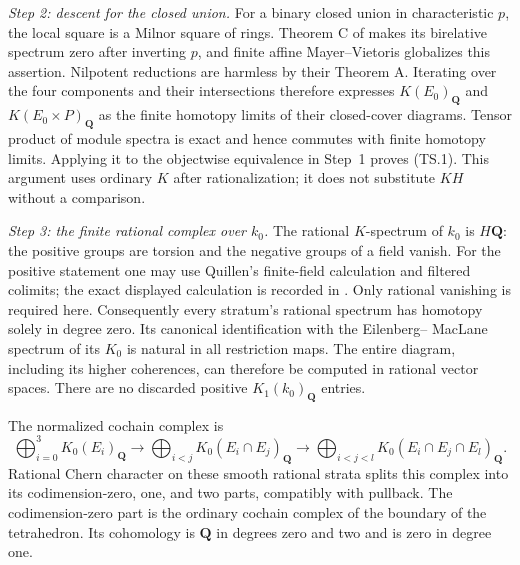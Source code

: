 \emph{Step 2: descent for the closed union.}
For a binary closed union in characteristic $p$, the local square is a
Milnor square of rings.  Theorem C of
\citet[p.~30]{rootGeisserHesselholt2011} makes its birelative spectrum
zero after inverting $p$, and finite affine Mayer--Vietoris globalizes
this assertion.  Nilpotent reductions are harmless by their Theorem A.
Iterating over the four components and their intersections therefore
expresses $K(E_0)_{\mathbf Q}$ and $K(E_0\times P)_{\mathbf Q}$ as
the finite homotopy limits of their closed-cover diagrams.  Tensor
product of module spectra is exact and hence commutes with finite
homotopy limits.  Applying it to the objectwise equivalence in Step~1
proves (TS.1).  This argument uses ordinary $K$ after rationalization;
it does not substitute $KH$ without a comparison.

\emph{Step 3: the finite rational complex over $k_0$.}
The rational $K$-spectrum of $k_0$ is $H\mathbf Q$: the positive
groups are torsion and the negative groups of a field vanish.
For the positive statement one may use Quillen's finite-field
calculation and filtered colimits; the exact displayed calculation
is recorded in \citet[Chapter~IV, Corollary~1.13 and Example~2.6]
{D_Weibel2013KbookIV}.  Only rational vanishing is required here.
Consequently every stratum's rational spectrum has homotopy solely
in degree zero.  Its canonical identification with the Eilenberg--
MacLane spectrum of its $K_0$ is natural in all restriction maps.
The entire diagram, including its higher coherences, can therefore be
computed in rational vector spaces.  There are no discarded positive
$K_1(k_0)_{\mathbf Q}$ entries.

The normalized cochain complex is
\begin{equation}
 \bigoplus_{i=0}^3 K_0(E_i)_{\mathbf Q}
   \longrightarrow \bigoplus_{i<j}K_0(E_i\cap E_j)_{\mathbf Q}
   \longrightarrow \bigoplus_{i<j<l}K_0(E_i\cap E_j\cap E_l)_{\mathbf Q}.
 \tag{TS.3}
\end{equation}
Rational Chern character on these smooth rational strata splits this
complex into its codimension-zero, one, and two parts, compatibly
with pullback.  The codimension-zero part is the ordinary cochain
complex of the boundary of the tetrahedron.  Its cohomology is
$\mathbf Q$ in degrees zero and two and is zero in degree one.

